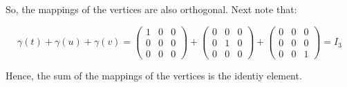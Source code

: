 \begin{solution}
    So, the mappings of the vertices are also orthogonal. Next note that:

    $$\gamma(t)+\gamma(u)+\gamma(v)=\left(\begin{array}{ccc} 1 & 0 & 0 \\ 0 & 0 & 0 \\ 0 & 0 & 0 \end{array}\right)
    +\left(\begin{array}{ccc} 0 & 0 & 0 \\ 0 & 1 & 0 \\ 0 & 0 & 0 \end{array}\right)
    +\left(\begin{array}{ccc} 0 & 0 & 0 \\ 0 & 0 & 0 \\ 0 & 0 & 1 \end{array}\right)=I_3$$

    Hence, the sum of the mappings of the vertices is the identiy element.

\end{solution}